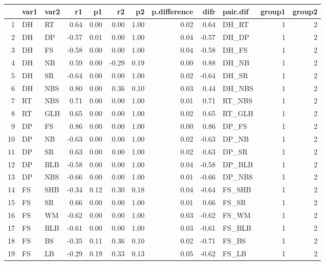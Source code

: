 \begin{table}[ht]
\centering
\begin{tabular}{rllrrrrrrlrr}
  \hline
 & var1 & var2 & r1 & p1 & r2 & p2 & p.difference & difr & pair.dif & group1 & group2 \\ 
  \hline
1 & DH & RT & 0.64 & 0.00 & 0.00 & 1.00 & 0.02 & 0.64 & DH\_RT &   1 &   2 \\ 
  2 & DH & DP & -0.57 & 0.01 & 0.00 & 1.00 & 0.04 & -0.57 & DH\_DP &   1 &   2 \\ 
  3 & DH & FS & -0.58 & 0.00 & 0.00 & 1.00 & 0.04 & -0.58 & DH\_FS &   1 &   2 \\ 
  4 & DH & NB & 0.59 & 0.00 & -0.29 & 0.19 & 0.00 & 0.88 & DH\_NB &   1 &   2 \\ 
  5 & DH & SR & -0.64 & 0.00 & 0.00 & 1.00 & 0.02 & -0.64 & DH\_SR &   1 &   2 \\ 
  6 & DH & NBS & 0.80 & 0.00 & 0.36 & 0.10 & 0.03 & 0.44 & DH\_NBS &   1 &   2 \\ 
  7 & RT & NBS & 0.71 & 0.00 & 0.00 & 1.00 & 0.01 & 0.71 & RT\_NBS &   1 &   2 \\ 
  8 & RT & GLH & 0.65 & 0.00 & 0.00 & 1.00 & 0.02 & 0.65 & RT\_GLH &   1 &   2 \\ 
  9 & DP & FS & 0.86 & 0.00 & 0.00 & 1.00 & 0.00 & 0.86 & DP\_FS &   1 &   2 \\ 
  10 & DP & NB & -0.63 & 0.00 & 0.00 & 1.00 & 0.02 & -0.63 & DP\_NB &   1 &   2 \\ 
  11 & DP & SR & 0.63 & 0.00 & 0.00 & 1.00 & 0.02 & 0.63 & DP\_SR &   1 &   2 \\ 
  12 & DP & BLB & -0.58 & 0.00 & 0.00 & 1.00 & 0.04 & -0.58 & DP\_BLB &   1 &   2 \\ 
  13 & DP & NBS & -0.66 & 0.00 & 0.00 & 1.00 & 0.01 & -0.66 & DP\_NBS &   1 &   2 \\ 
  14 & FS & SHB & -0.34 & 0.12 & 0.30 & 0.18 & 0.04 & -0.64 & FS\_SHB &   1 &   2 \\ 
  15 & FS & SR & 0.66 & 0.00 & 0.00 & 1.00 & 0.01 & 0.66 & FS\_SR &   1 &   2 \\ 
  16 & FS & WM & -0.62 & 0.00 & 0.00 & 1.00 & 0.03 & -0.62 & FS\_WM &   1 &   2 \\ 
  17 & FS & BLB & -0.61 & 0.00 & 0.00 & 1.00 & 0.03 & -0.61 & FS\_BLB &   1 &   2 \\ 
  18 & FS & BS & -0.35 & 0.11 & 0.36 & 0.10 & 0.02 & -0.71 & FS\_BS &   1 &   2 \\ 
  19 & FS & LB & -0.29 & 0.19 & 0.33 & 0.13 & 0.05 & -0.62 & FS\_LB &   1 &   2 \\ 

\end{tabular}
\end{table}
